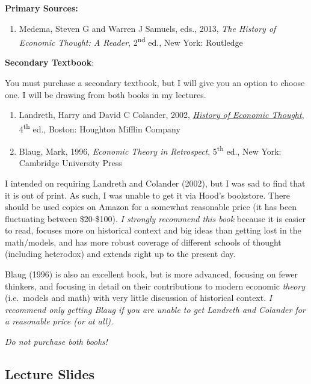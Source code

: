 \documentclass{article}
\providecommand{\tightlist}{%
  \setlength{\itemsep}{0pt}\setlength{\parskip}{0pt}}
\begin{document}
\textbf{Primary Sources:}

\begin{enumerate}
\def\labelenumi{\arabic{enumi}.}
\tightlist
\item
  Medema, Steven G and Warren J Samuels, eds., 2013, \emph{The History
  of Economic Thought: A Reader}, 2\textsuperscript{nd} ed., New York:
  Routledge
\end{enumerate}

\textbf{Secondary Textbook}:

You must purchase a secondary textbook, but I will give you an option to
choose one. I will be drawing from both books in my lectures.

\begin{enumerate}
\def\labelenumi{\arabic{enumi}.}
\setcounter{enumi}{1}
\item
  Landreth, Harry and David C Colander, 2002,
  \href{https://www.amazon.com/History-Economic-Thought-Harry-Landreth/dp/0618133941}{\emph{History
  of Economic Thought}}, 4\textsuperscript{th} ed., Boston: Houghton
  Mifflin Company
\item
  Blaug, Mark, 1996, \emph{Economic Theory in Retrospect},
  5\textsuperscript{th} ed., New York: Cambridge University Press
\end{enumerate}

I intended on requiring Landreth and Colander (2002), but I was sad to
find that it is out of print. As such, I was unable to get it via Hood's
bookstore. There should be used copies on Amazon for a somewhat
reasonable price (it has been fluctuating between \$20-\$100). \emph{I
strongly recommend this book} because it is easier to read, focuses more
on historical context and big ideas than getting lost in the
math/models, and has more robust coverage of different schools of
thought (including heterodox) and extends right up to the present day.

Blaug (1996) is also an excellent book, but is more advanced, focusing
on fewer thinkers, and focusing in detail on their contributions to
modern economic \emph{theory} (i.e.~models and math) with very little
discussion of historical context. \emph{I recommend only getting Blaug
if you are unable to get Landreth and Colander for a reasonable price
(or at all).}

\emph{Do not purchase both books!}

\hypertarget{lecture-slides}{%
\subsection*{Lecture Slides}\label{lecture-slides}}
\end{document}
